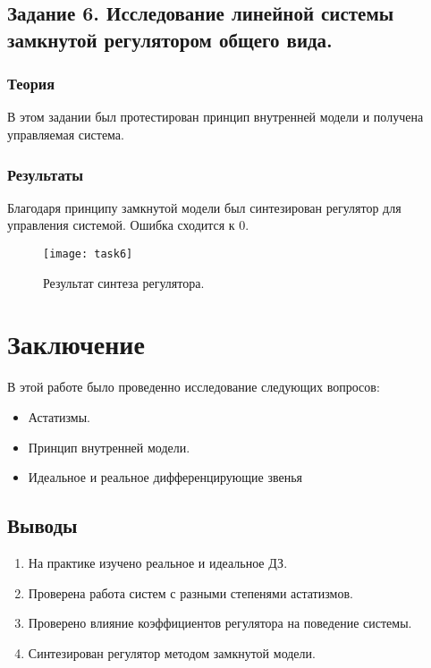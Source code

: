 \documentclass[16pt]{article}
\begin{document}
\subsection{Задание 6. Исследование линейной системы замкнутой регулятором общего вида.}

\subsubsection{Теория}
В этом задании был протестирован принцип внутренней модели и получена управляемая система.
\subsubsection{Результаты}
Благодаря принципу замкнутой модели был синтезирован регулятор для управления системой. Ошибка сходится к 0.
\begin{figure}[h!]
    \centering
    \texttt{[image: task6]}
    \caption{Результат синтеза регулятора.}
    \label{fig:fig13}
\end{figure}

\pagebreak
\pagebreak
\section{Заключение}
В этой работе было проведенно исследование следующих вопросов:
\begin{itemize}
    \item Астатизмы.
    \item Принцип внутренней модели.
    \item Идеальное и реальное дифференцирующие звенья
\end{itemize} 
\subsection{Выводы}
\begin{enumerate}
   \item На практике изучено реальное и идеальное ДЗ.
   \item Проверена работа систем с разными степенями астатизмов. 
   \item Проверено влияние коэффициентов регулятора на поведение системы.
   \item Синтезирован регулятор методом замкнутой модели.
\end{enumerate}
\end{document}
